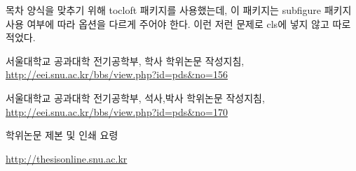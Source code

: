 \documentclass[a4paper]{report}
\begin{document}
목차 양식을 맞추기 위해 tocloft 패키지를 사용했는데,
이 패키지는
subfigure 패키지 사용 여부에 따라 옵션을 다르게 주어야 한다.
이런 저런 문제로 cls에 넣지 않고 따로 적었다.

\begin{thebibliography}{00}

 서울대학교 공과대학 전기공학부,
학사 학위논문 작성지침,
\url{http://eei.snu.ac.kr/bbs/view.php?id=pds&no=156}

 서울대학교 공과대학 전기공학부,
석사,박사 학위논문 작성지침,
\url{http://eei.snu.ac.kr/bbs/view.php?id=pds&no=170}

 학위논문 제본 및 인쇄 요령

\url{http://thesisonline.snu.ac.kr}
\end{thebibliography}
\end{document}
